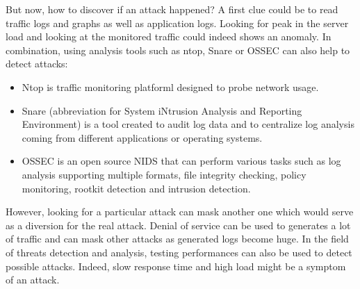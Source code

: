 But now, how to discover if an attack happened? A first clue could be to read
traffic logs and graphs as well as application logs. Looking for peak in the
server load and looking at the monitored traffic could indeed shows an anomaly.
In combination, using analysis tools such as ntop, Snare or OSSEC can also help
to detect attacks:
\begin{itemize}
\item Ntop is traffic monitoring platforml designed to probe network usage.
\item Snare (abbreviation for System iNtrusion Analysis and Reporting
	Environment) is a tool created to audit log data and to centralize log
	analysis coming from different applications or operating systems.
\item OSSEC is an open source NIDS that can perform various tasks such as log
analysis supporting multiple formats, file integrity checking, policy
monitoring, rootkit detection and intrusion detection.
\end{itemize}

However, looking for a particular attack can mask another one which would serve
as a diversion for the real attack. Denial of service can be used to generates a
lot of traffic and can mask other attacks as generated logs become huge. In the
field of threats detection and analysis, testing performances can also be used
to detect possible attacks. Indeed, slow response time and high load might be a
symptom of an attack.
